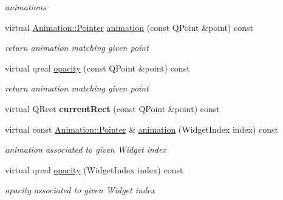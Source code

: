 \begin{DoxyCompactItemize}
\begin{DoxyCompactList}\small\item\em animations \end{DoxyCompactList}\item 
\mbox{\label{class_menu_bar_data_v1_a6e87ad120e49ebd8f76327195e11b6a4}} 
virtual \hyperlink{class_animation_ac48a8d074abd43dc3f6485353ba24e30}{Animation\+::\+Pointer} \hyperlink{class_menu_bar_data_v1_a6e87ad120e49ebd8f76327195e11b6a4}{animation} (const Q\+Point \&point) const
\begin{DoxyCompactList}\small\item\em return animation matching given point \end{DoxyCompactList}\item 
\mbox{\label{class_menu_bar_data_v1_ab25c8391a57dec0f42c15c13e63c263b}} 
virtual qreal \hyperlink{class_menu_bar_data_v1_ab25c8391a57dec0f42c15c13e63c263b}{opacity} (const Q\+Point \&point) const
\begin{DoxyCompactList}\small\item\em return animation matching given point \end{DoxyCompactList}\item 
\mbox{\label{class_menu_bar_data_v1_a760c1702ac022e30fccaf63146661a0a}} 
virtual Q\+Rect {\bfseries current\+Rect} (const Q\+Point \&point) const
\item 
\mbox{\label{class_menu_bar_data_v1_a48fb816f442d532bb42ace836da6f1e5}} 
virtual const \hyperlink{class_animation_ac48a8d074abd43dc3f6485353ba24e30}{Animation\+::\+Pointer} \& \hyperlink{class_menu_bar_data_v1_a48fb816f442d532bb42ace836da6f1e5}{animation} (Widget\+Index index) const
\begin{DoxyCompactList}\small\item\em animation associated to given Widget index \end{DoxyCompactList}\item 
\mbox{\label{class_menu_bar_data_v1_a8440c6e7c4cffe65e7ae976ac30d57a5}} 
virtual qreal \hyperlink{class_menu_bar_data_v1_a8440c6e7c4cffe65e7ae976ac30d57a5}{opacity} (Widget\+Index index) const
\begin{DoxyCompactList}\small\item\em opacity associated to given Widget index \end{DoxyCompactList}\item 

\end{DoxyCompactItemize}
